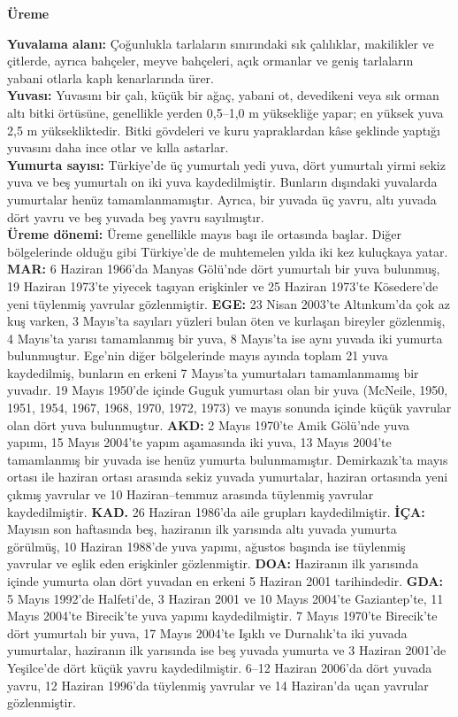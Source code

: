 \documentclass[
  10.5pt,
  a4paper,
  DIV=11,
  numbers=noendperiod,
  twocolumn]{scrreprt}
\begin{document}
\textbf{Üreme}

\textbf{Yuvalama alanı:} Çoğunlukla tarlaların sınırındaki sık
çalılıklar, makilikler ve çitlerde, ayrıca bahçeler, meyve bahçeleri,
açık ormanlar ve geniş tarlaların yabani otlarla kaplı kenarlarında
ürer.\\
\textbf{Yuvası:} Yuvasını bir çalı, küçük bir ağaç, yabani ot,
devedikeni veya sık orman altı bitki örtüsüne, genellikle yerden
0,5--1,0 m yüksekliğe yapar; en yüksek yuva 2,5 m yüksekliktedir. Bitki
gövdeleri ve kuru yapraklardan kâse şeklinde yaptığı yuvasını daha ince
otlar ve kılla astarlar.\\
\textbf{Yumurta sayısı:} Türkiye'de üç yumurtalı yedi yuva, dört
yumurtalı yirmi sekiz yuva ve beş yumurtalı on iki yuva kaydedilmiştir.
Bunların dışındaki yuvalarda yumurtalar henüz tamamlanmamıştır. Ayrıca,
bir yuvada üç yavru, altı yuvada dört yavru ve beş yuvada beş yavru
sayılmıştır.\\
\textbf{Üreme dönemi:} Üreme genellikle mayıs başı ile ortasında başlar.
Diğer bölgelerinde olduğu gibi Türkiye'de de muhtemelen yılda iki kez
kuluçkaya yatar. \textbf{MAR:} 6 Haziran 1966'da Manyas Gölü'nde dört
yumurtalı bir yuva bulunmuş, 19 Haziran 1973'te yiyecek taşıyan
erişkinler ve 25 Haziran 1973'te Kösedere'de yeni tüylenmiş yavrular
gözlenmiştir. \textbf{EGE:} 23 Nisan 2003'te Altınkum'da çok az kuş
varken, 3 Mayıs'ta sayıları yüzleri bulan öten ve kurlaşan bireyler
gözlenmiş, 4 Mayıs'ta yarısı tamamlanmış bir yuva, 8 Mayıs'ta ise aynı
yuvada iki yumurta bulunmuştur. Ege'nin diğer bölgelerinde mayıs ayında
toplam 21 yuva kaydedilmiş, bunların en erkeni 7 Mayıs'ta yumurtaları
tamamlanmamış bir yuvadır. 19 Mayıs 1950'de içinde Guguk yumurtası olan
bir yuva (McNeile, 1950, 1951, 1954, 1967, 1968, 1970, 1972, 1973) ve
mayıs sonunda içinde küçük yavrular olan dört yuva bulunmuştur.
\textbf{AKD:} 2 Mayıs 1970'te Amik Gölü'nde yuva yapımı, 15 Mayıs
2004'te yapım aşamasında iki yuva, 13 Mayıs 2004'te tamamlanmış bir
yuvada ise henüz yumurta bulunmamıştır. Demirkazık'ta mayıs ortası ile
haziran ortası arasında sekiz yuvada yumurtalar, haziran ortasında yeni
çıkmış yavrular ve 10 Haziran--temmuz arasında tüylenmiş yavrular
kaydedilmiştir. \textbf{KAD.} 26 Haziran 1986'da aile grupları
kaydedilmiştir. \textbf{İÇA:} Mayısın son haftasında beş, haziranın ilk
yarısında altı yuvada yumurta görülmüş, 10 Haziran 1988'de yuva yapımı,
ağustos başında ise tüylenmiş yavrular ve eşlik eden erişkinler
gözlenmiştir. \textbf{DOA:} Haziranın ilk yarısında içinde yumurta olan
dört yuvadan en erkeni 5 Haziran 2001 tarihindedir. \textbf{GDA:} 5
Mayıs 1992'de Halfeti'de, 3 Haziran 2001 ve 10 Mayıs 2004'te
Gaziantep'te, 11 Mayıs 2004'te Birecik'te yuva yapımı kaydedilmiştir. 7
Mayıs 1970'te Birecik'te dört yumurtalı bir yuva, 17 Mayıs 2004'te
Işıklı ve Durnalık'ta iki yuvada yumurtalar, haziranın ilk yarısında ise
beş yuvada yumurta ve 3 Haziran 2001'de Yeşilce'de dört küçük yavru
kaydedilmiştir. 6--12 Haziran 2006'da dört yuvada yavru, 12 Haziran
1996'da tüylenmiş yavrular ve 14 Haziran'da uçan yavrular gözlenmiştir.
\end{document}
